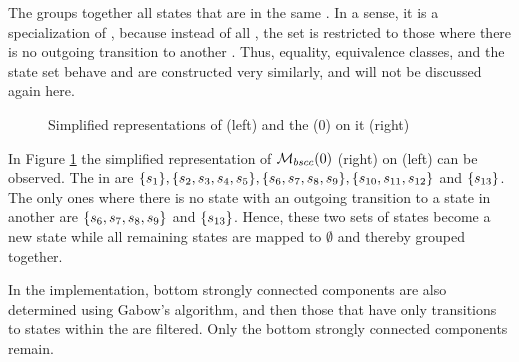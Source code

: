 \documentclass[preview]{standalone}
\begin{document}
The \viewN \viewbscc groups together all states that are in the same \bsccN. In a sense, it is a specialization of \viewscc, because instead of all \sccsN, the set is restricted to those where there is no outgoing transition to another \sccN. Thus, equality, equivalence classes, and the state set behave and are constructed very similarly, and will not be discussed again here.

\begin{figure}[!t]
	\begin{minipage}{.55\textwidth}
		\hspace{5mm}
		
	\end{minipage}
	\begin{minipage}{.5\textwidth}		
		
	\end{minipage}
	\caption{Simplified representations of \mdp (left) and the \viewN \viewbscc(0) on it (right)}
	\label{fig:bsccAfter} 
\end{figure}

\begin{exmp}
	\sloppy In Figure \ref{fig:bsccAfter} the simplified representation of ${{{{{\mathcal{M}}}}_{{bscc}}}}(0)$ (right) on \chgph (left) can be observed. The \sccsN in \chgph are $\{{s}_1\}, \{{s}_2, {s}_3, {s}_4, {s}_5\}, \{{s}_6, {s}_7, {s}_8, {s}_9\}, \{{s}_{10}, {s}_{11}, {s}_{12}\}$ and $\{{s}_{13}\}$. The only ones where there is no state with an outgoing transition to a state in another \sccN are $\{{s}_6, {s}_7, {s}_8, {s}_9\}$ and $\{{s}_{13}\}$. Hence, these two sets of states become a new state \viewbscc while all remaining states are mapped to $\emptyset$ and thereby grouped together.
\end{exmp}

In the implementation, bottom strongly connected components are also determined using Gabow's algorithm, and then those \sccsN that have only transitions to states within the \sccN are filtered. Only the bottom strongly connected components remain.
	
\end{document}
